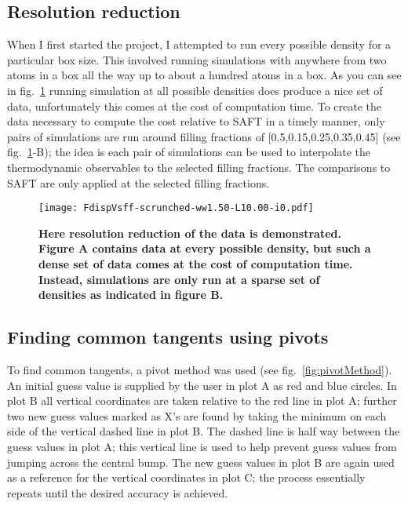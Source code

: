 \subsection{Resolution reduction}
When I first started the project, I attempted to run every possible density for a particular box size. This involved running simulations with anywhere from two atoms in a box all the way up to about a hundred atoms in a box. As you can see in fig.~\ref{fig:FdispVsff} running simulation at all possible densities does produce a nice set of data, unfortunately this comes at the cost of computation time. To create the data necessary to compute the cost relative to SAFT in a timely manner, only pairs of simulations are run around filling fractions of [0.5,0.15,0.25,0.35,0.45] (see fig.~\ref{fig:FdispVsff}-B); the idea is each pair of simulations can be used to interpolate the thermodynamic observables to the selected filling fractions. The comparisons to SAFT are only applied at the selected filling fractions.
\begin{figure}[h]
	\centering
	\texttt{[image: FdispVsff-scrunched-ww1.50-L10.00-i0.pdf]}
	\caption{\label{fig:FdispVsff}
	\scriptsize \textbf{Here resolution reduction of the data is demonstrated. Figure A contains data at every possible density, but such a dense set of data comes at the cost of computation time. Instead, simulations are only run at a sparse set of densities as indicated in figure B.}}
	
\end{figure}
\vspace*{-10mm}
\subsection{Finding common tangents using pivots}
To find common tangents, a pivot method was used (see fig.~\ref{fig:pivotMethod}). An initial guess value is supplied by the user in plot A as red and blue circles. In plot B all vertical coordinates are taken relative to the red line in plot A; further two new guess values marked as X's are found by taking the minimum on each side of the vertical dashed line in plot B. The dashed line is half way between the guess values in plot A; this vertical line is used to help prevent guess values from jumping across the central bump. The new guess values in plot B are again used as a reference for the vertical coordinates in plot C; the process essentially repeats until the desired accuracy is achieved.

